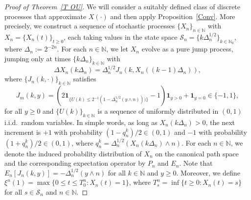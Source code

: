 \begin{proof}[Proof of Theorem~\ref{T OU}]
We will consider a suitably defined class of discrete processes that
approximate $X\left( \cdot \right) $ and then apply Proposition~\ref{Conv}.
More precisely, we construct a sequence of stochastic processes $%
\{X_{n}\}_{n \in \mathbb{N}}$ with $X_{n}=\{X_{n}(t)\}_{t\geq 0}$, each
taking values in the state space $\mathcal{S}_{n}=\{k\Delta
_{n}^{1/2}\}_{k\in \mathbb{N}_{0}}$, where $\Delta _{n}:=2^{-2n}$. For each $%
n \in \mathbb{N}$, we let $X_{n}$ evolve as a pure jump process, jumping
only at times $\{k\Delta _{n}\}_{k\in \mathbb{N}}$ with
\begin{equation*}
\Delta X_{n}\left( k\Delta _{n}\right) =\Delta _{n}^{1/2}J_{n}\left(
k,X_{n}\left( (k-1)\Delta _{n}\right) \right) ,
\end{equation*}%
where $\{J_{n}(k,\cdot )\}_{k\in \mathbb{N}}$ satisfies
\begin{equation*}
J_{m}(k,y)=\left( 2\mathbf{1}_{\{U(k)\leq 2^{-1}(1-\Delta _{n}^{1/2}(y\wedge
n)))\}}-1\right) \mathbf{1}_{y>0}+\mathbf{1}_{y=0} \in \{-1,1\},
\end{equation*}%
for all $y \geq 0$ and $\{U\left( k\right) \}_{k\in \mathbb{N}}$ is a
sequence of uniformly distributed in $(0,1)$ i.i.d.~random variables. In
simple words, as long as $X_{n}\left( k\Delta _{n}\right) >0$, the next
increment is $+1$ with probability $(1-q_n^k)/2\in (0,1)$ and $-1$ with
probability $(1+q_n^k)/2\in (0,1)$, where $q_n^k = \Delta
_{n}^{1/2}(X_{n}(k\Delta _{n})\wedge n)$. For each $n \in \mathbb{N}$, we
denote the induced probability distribution of $X_n$ on the canonical path space and the corresponding
expectation operator by $P_n$ and $E_n$. Note that $E_n[J_{n}(k,y)]=-\Delta
_{n}^{1/2}(y\wedge n)$ for all $k \in \mathbb{N}$ and $y \geq 0$. Moreover,
we define $\xi ^{n}\left( 1\right) =\max \{0 \leq t \leq T_0^n:X_{n}\left(
t\right) =1\}$, where $T_{s}^n=\inf \{t\geq 0:X_n\left( t\right) =s\}$ for
all $s\in \mathcal{S}_{n}$ and $n \in \mathbb{N}$.


\end{proof}
